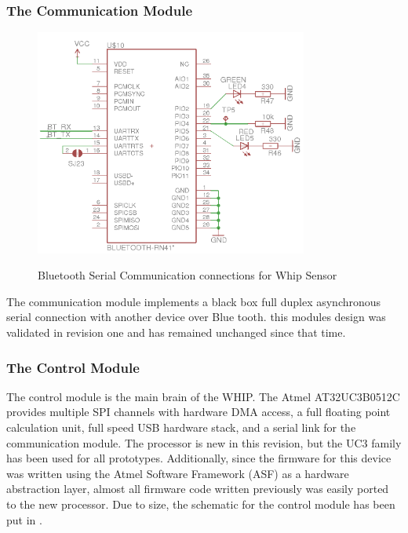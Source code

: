 \subsubsection{The Communication Module}
\begin{figure}
	\begin{center}
		\label{fig:Rev5_BT}
		\includegraphics[scale=1,width=0.8\textwidth]{Images/Rev5_BT.png} 
		\caption{Bluetooth Serial Communication connections for Whip Sensor}
	\end{center}
\end{figure}
The communication module implements a black box full duplex asynchronous serial connection with another device over Blue tooth. this modules design was validated in revision one and has remained unchanged since that time. 

\subsubsection{The Control Module}
The control module is the main brain of the WHIP. The Atmel AT32UC3B0512C provides multiple SPI channels with hardware DMA access, a full floating point calculation unit, full speed USB hardware stack, and a serial link for the communication module.\cite{AT32UC3B} The processor is new in this revision, but the UC3 family has been used for all prototypes. Additionally, since the firmware for this device was written using the Atmel Software Framework (ASF) as a hardware abstraction layer, almost all firmware code written previously was easily ported to the new processor. Due to size, the schematic for the control module has been put in .

